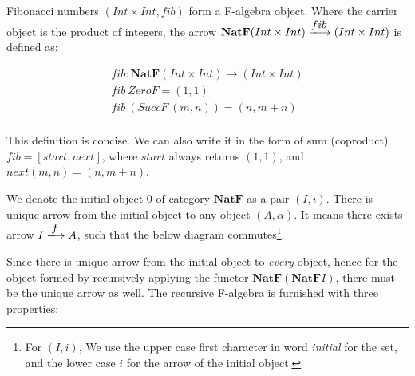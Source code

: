 \documentclass{article}
\begin{document}

Fibonacci numbers $(Int \times Int, fib)$ form a F-algebra object. Where the carrier object is the product of integers, the arrow $\mathbf{NatF} (Int \times Int) \arrowto{fib} (Int \times Int)$ is defined as:

\[
\begin{array}{l}
fib : \mathbf{NatF} (Int \times Int) \to (Int \times Int) \\
fib\ ZeroF = (1, 1) \\
fib\ (SuccF\ (m, n)) = (n, m + n) \\
\end{array}
\]

This definition is concise. We can also write it in the form of sum (coproduct) $fib = [start, next]$, where $start$ always returns $(1, 1)$, and $next(m, n) = (n, m + n)$.

We denote the initial object 0 of category $\pmb{NatF}$ as a pair $(I, i)$. There is unique arrow from the initial object to any object $(A, \alpha)$. It means there exists arrow $I \arrowto{f} A$, such that the below diagram commutes\footnote{For $(I, i)$, We use the upper case first character in word {\em initial} for the set, and the lower case $i$ for the arrow of the initial object.}.

\begin{center}
\end{center}

Since there is unique arrow from the initial object to {\em every} object, hence for the object formed by recursively applying the functor $\mathbf{NatF}(\mathbf{NatF}I)$, there must be the unique arrow as well. The recursive F-algebra is furnished with three properties:
\end{document}
